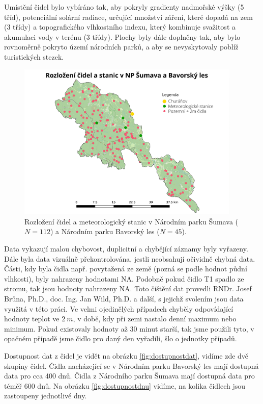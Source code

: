 Umístění čidel bylo vybíráno tak, aby pokryly gradienty nadmořské výšky (5 tříd), potenciální solární radiace, určující množství záření, které dopadá na zem (3 třídy) a topografického vlhkostního indexu, který kombinuje svažitost a akumulaci vody v terénu (3 třídy). Plochy byly dále doplněny tak, aby bylo rovnoměrně pokryto území národních parků, a aby se nevyskytovaly poblíž turistických stezek.

\begin{figure}
	\centering
	\includegraphics[width=0.95\textwidth]{img/rozlozenicidel.pdf}
	\caption{Rozložení čidel a meteorologický stanic v Národním parku Šumava ($N=112$) a Národním parku Bavorský les ($N=45$).}
	\label{fig:rozlozenicidel}
\end{figure}

Data vykazují malou chybovost, duplicitní a chybějící záznamy byly vyřazeny. Dále byla data vizuálně překontrolována, jestli neobsahují očividně chybná data. Části, kdy byla čidla např. povytažená ze země (pozná se podle hodnot půdní vlhkosti), byly nahrazeny hodnotami NA. Podobně pokud čidlo T1 spadlo ze stromu, tak jsou hodnoty nahrazeny NA. Toto čištění dat provedli RNDr. Josef Brůna, Ph.D., doc. Ing. Jan Wild, Ph.D. a další, s jejichž svolením jsou data využitá v této práci. Ve velmi ojedinělých případech chyběly odpovídající hodnoty teplot ve $\SI{2}{m}$, v době, kdy při zemi nastalo denní maximum nebo minimum. Pokud existovaly hodnoty až 30 minut starší, tak jsme použili tyto, v opačném případě jsme čidlo pro daný den vyřadili, šlo o jednotky případů.

Dostupnost dat z čidel je vidět na obrázku \ref{fig:dostupnostdat}, vidíme zde dvě skupiny čidel. Čidla nacházející se v Národním parku Bavorský les mají dostupná data pro cca 400 dnů. Čidla z Národního parku Šumava mají dostupná data pro téměř 600 dnů. Na obrázku \ref{fig:dostupnostdnu} vidíme, na kolika čidlech jsou zastoupeny jednotlivé dny.

